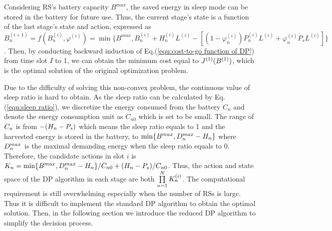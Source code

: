 \documentclass[conference]{IEEEtran}
\begin{document}
 Considering RS's battery capacity $B^{max}$, the saved energy in sleep mode can be stored in the battery for future use. Thus, the current stage's state is a function of the last stage's state and action, expressed as $B_n^{(i+1)}=f(B_n^{(i)},\varphi^{(i)}) = \min\{B^{max}, B_n^{(i)}+H_n^{(i)}L^{(i)}- [(1- \varphi_n^{(i)})P_n^{(i)}L^{(i)}+\varphi_n^{(i)}P_sL^{(i)}]\}$.
  Then, by conducting backward induction of Eq.(\ref{equ:cost-to-go function of DP}) from time slot $I$ to 1, we can obtain the minimum cost equal to $\footnotesize{J^{(1)}(B^{(1)})}$, which is the optimal solution of the original optimization problem.

  Due to the difficulty of solving this non-convex problem, the continuous value of sleep ratio is hard to obtain. As the sleep ratio can be calculated by Eq.(\ref{equ:sleep ratio}), we discretize the energy consumed from the battery $C_n$ and denote the energy consumption unit as $C_{n0}$ which is set to be small. The range of $\footnotesize{C_n}$ is from $\footnotesize{-(H_n-P_s)}$ which means the sleep ratio equals to 1 and the harvested energy is stored in the battery, to $\footnotesize{\min\{B^{max},D_n^{max}-H_n\}}$ where $\footnotesize{D_n^{max}}$ is the maximal demanding energy when the sleep ratio equals to 0. Therefore, the candidate actions in slot $i$ is $\footnotesize{K_n=\min\{B^{max},D_n^{max}-H_n\}/C_{n0}+(H_n-P_s)/C_{n0}}$. Thus, the action and state space of the DP algorithm in each stage are both $\footnotesize{\prod\limits_{n=1}^NK_n^{(i)}}$. The computational requirement is still overwhelming especially when the number of RSs is large. Thus it is difficult to implement the standard DP algorithm to obtain the optimal solution. Then, in the following section we introduce the reduced DP algorithm to simplify the decision process.
\end{document}
